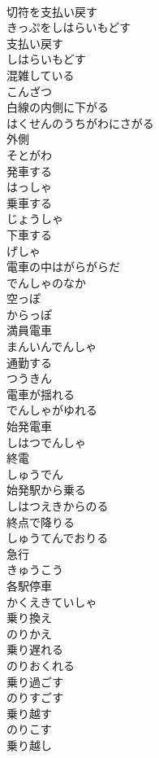 \documentclass[8pt]{extreport}
\begin{document}
\begin{CJK}{UTF8}{min}
\\	切符を支払い戻す	
\\	きっぷをしはらいもどす
\\	支払い戻す	
\\	しはらいもどす
\\	混雑している	
\\	こんざつ
\\	白線の内側に下がる	
\\	はくせんのうちがわにさがる
\\	外側	
\\	そとがわ
\\	発車する	
\\	はっしゃ
\\	乗車する	
\\	じょうしゃ
\\	下車する	
\\	げしゃ
\\	電車の中はがらがらだ	
\\	でんしゃのなか
\\	空っぽ	
\\	からっぽ
\\	満員電車	
\\	まんいんでんしゃ
\\	通勤する	
\\	つうきん
\\	電車が揺れる	
\\	でんしゃがゆれる
\\	始発電車	
\\	しはつでんしゃ
\\	終電	
\\	しゅうでん
\\	始発駅から乗る	
\\	しはつえきからのる
\\	終点で降りる	
\\	しゅうてんでおりる
\\	急行	
\\	きゅうこう
\\	各駅停車	
\\	かくえきていしゃ
\\	乗り換え	
\\	のりかえ
\\	乗り遅れる	
\\	のりおくれる
\\	乗り過ごす	
\\	のりすごす
\\	乗り越す	
\\	のりこす
\\	乗り越し	

\end{CJK}
\end{document}
